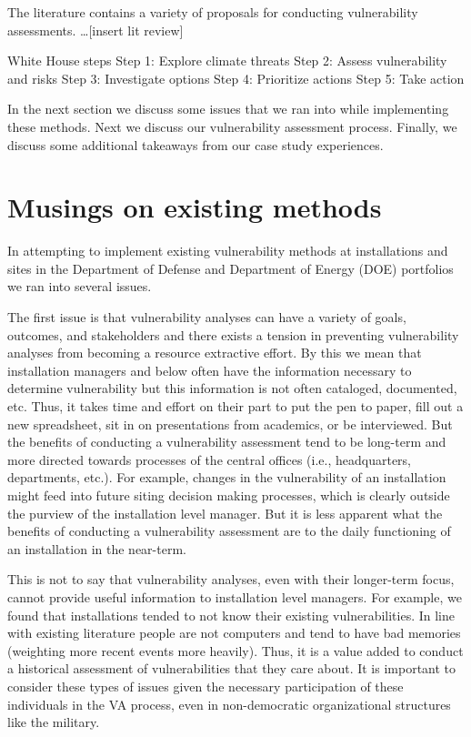 \documentclass[10pt]{amsart}
\begin{document}
The literature contains a variety of proposals for conducting vulnerability assessments. 
\ldots [insert lit review]

White House steps
Step 1: Explore climate threats
Step 2: Assess vulnerability and risks
Step 3: Investigate options
Step 4: Prioritize actions
Step 5: Take action


In the next section we discuss some issues that we ran into while implementing these methods.
Next we discuss our vulnerability assessment process.
Finally, we discuss some additional takeaways from our case study experiences.

\section{Musings on existing methods}
In attempting to implement existing vulnerability methods at installations and sites in the Department of Defense and Department of Energy (DOE) portfolios we ran into several issues.

The first issue is that vulnerability analyses can have a variety of goals, outcomes, and stakeholders and there exists a tension in preventing vulnerability analyses from becoming a resource extractive effort.
By this we mean that installation managers and below often have the information necessary to determine vulnerability but this information is not often cataloged, documented, etc.
Thus, it takes time and effort on their part to put the pen to paper, fill out a new spreadsheet, sit in on presentations from academics, or be interviewed.
But the benefits of conducting a vulnerability assessment tend to be long-term and more directed towards processes of the central offices (i.e., headquarters, departments, etc.).
For example, changes in the vulnerability of an installation might feed into future siting decision making processes, which is clearly outside the purview of the installation level manager.
But it is less apparent what the benefits of conducting a vulnerability assessment are to the daily functioning of an installation in the near-term.

This is not to say that vulnerability analyses, even with their longer-term focus, cannot provide useful information to installation level managers.
For example, we found that installations tended to not know their existing vulnerabilities.
In line with existing literature people are not computers and tend to have bad memories (weighting more recent events more heavily).
Thus, it is a value added to conduct a historical assessment of vulnerabilities that they care about.
It is important to consider these types of issues given the necessary participation of these individuals in the VA process, even in non-democratic organizational structures like the military. 
\end{document}
